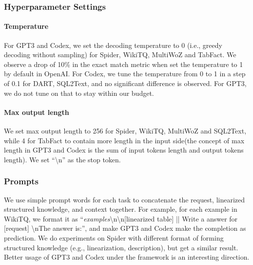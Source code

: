 \documentclass[11pt]{article}
\begin{document}
\subsubsection{Hyperparameter Settings}
\paragraph{Temperature} For GPT3 and Codex, we set the decoding temperature to 0 (i.e., greedy decoding without sampling) for Spider, WikiTQ, MultiWoZ and TabFact. We observe a drop of 10\% in the exact match metric when set the temperature to 1 by default in OpenAI. For Codex, we tune the temperature from 0 to 1 in a step of 0.1 for DART, SQL2Text, and no significant difference is observed. For GPT3, we do not tune on that to stay within our budget.
\paragraph{Max output length}
We set max output length to 256 for Spider, WikiTQ, MultiWoZ and SQL2Text, while 4 for TabFact to contain more length in the input side(the concept of max length in GPT3 and Codex is the sum of input tokens length and output tokens length). We set ``\textbackslash n'' as the stop token.
\subsubsection{Prompts}
We use simple prompt words for each task to concatenate the request, linearized structured knowledge, and context together.
For example, for each example in WikiTQ, we format it as ``\textit{examples}\textbackslash n\textbackslash n[linearized table] || Write a answer for [request] \textbackslash nThe answer is:'', and make GPT3 and Codex make the completion as prediction. 
We do experiments on Spider with different format of forming structured knowledge (e.g., linearization, description), but get a similar result.
Better usage of GPT3 and Codex under the \uskg framework is an interesting direction.
\end{document}
